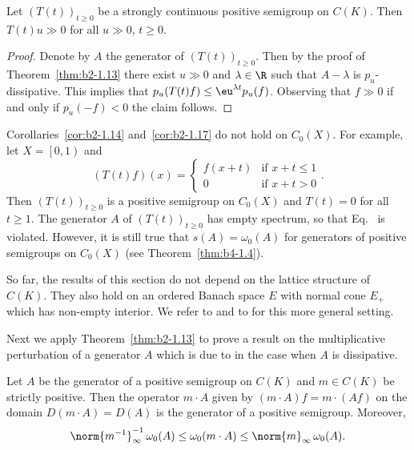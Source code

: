 \begin{corollary}\label{cor:b2-1.17}
Let $(T(t))_{t \geq 0}$ be a strongly continuous positive semigroup on $C(K)$.
Then $T(t)u \gg 0$ for all $u \gg 0$, $t \geq 0$.
\end{corollary}
\begin{proof}
Denote by $A$ the generator of\/ $(T(t))_{t \geq 0}$.
Then by the proof of Theorem~\ref{thm:b2-1.13} there exist $u \gg 0$ and $\lambda \in \R$ such that $A - \lambda$ is $p_{u}$-dissipative.
This implies that $p_{u}(T(t)f) \leq \eu^{\lambda t}p_{u}(f)$.
Observing that $f \gg 0$ if and only if\/ $p_{u}(-f) < 0$ the claim follows.
\end{proof}
\begin{remark}\label{rem:b2-1.18}
Corollaries~\ref{cor:b2-1.14} and~\ref{cor:b2-1.17} do not hold on $C_{0}(X)$.
For example, let $X = \left[0,1\right)$ and
\[
    (T(t)f)(x) = \begin{cases}
        f(x+t) & \text{if } x+t \leq 1 \\
        0 & \text{if } x+t > 0
    \end{cases}.
\]
Then $(T(t))_{t \geq 0}$ is a positive semigroup on $C_{0}(X)$ and $T(t) = 0$ for all $t \geq 1$.
The generator $A$ of\/ $(T(t))_{t \geq 0}$ has empty spectrum, so that Eq.~ is violated.
However, it is still true that $s(A) = \omega_{0}(A)$ for generators of positive semigroups on $C_{0}(X)$ (see Theorem~\ref{thm:b4-1.4}).
\end{remark}
\begin{remark}\label{rem:b2-1.19}
So far, the results of this section do not depend on the lattice structure of\/ $C(K)$.
They also hold on an ordered Banach space $E$ with normal cone $E_{+}$ which has non-empty interior.
We refer to \textcite{arendtchernoffkato:1982} and to \textcite{battyrobinson:1984} for this more general setting.
\end{remark}
Next we apply Theorem~\ref{thm:b2-1.13} to prove a result on the multiplicative perturbation of a generator $A$ which is due to \textcite{dorroh:1966} in the case when $A$ is dissipative.
\begin{theorem}\label{thm:b2-1.20}
Let $A$ be the generator of a positive semigroup on $C(K)$ and  $m \in C(K)$ be strictly positive.
Then the operator $m \cdot A$ given by $(m \cdot A)f = m \cdot (Af)$ on the domain $D(m \cdot A) = D(A)$ is the generator of a positive semigroup.
Moreover,
\begin{equation}\label{eq:b2-1.10}
\norm{m^{-1}}_{\infty}^{-1}\, \omega_{0}(A) \leq \omega_{0}(m \cdot A) \leq \norm{m}_{\infty}\, \omega_{0}(A).
\end{equation}
\end{theorem}

